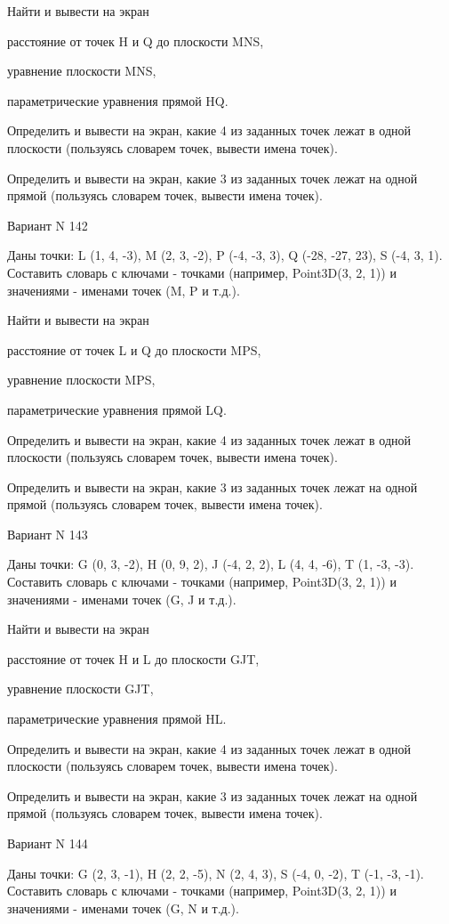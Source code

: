 \documentclass[11pt]{report}
\begin{document}
Найти и вывести на экран


расстояние от точек H и Q до плоскости MNS,


уравнение плоскости MNS,


параметрические уравнения прямой HQ.


Определить и вывести на экран, какие 4 из заданных точек лежат в одной плоскости (пользуясь словарем точек, вывести имена точек).


Определить и вывести на экран, какие 3 из заданных точек лежат на одной прямой (пользуясь словарем точек, вывести имена точек).

\newpage
Вариант N 142

Даны точки: L (1, 4, -3), M (2, 3, -2), P (-4, -3, 3), Q (-28, -27, 23), S (-4, 3, 1).
Составить словарь с ключами - точками (например, Point3D(3, 2, 1)) и значениями - именами точек (M, P и т.д.).


Найти и вывести на экран


расстояние от точек L и Q до плоскости MPS,


уравнение плоскости MPS,


параметрические уравнения прямой LQ.


Определить и вывести на экран, какие 4 из заданных точек лежат в одной плоскости (пользуясь словарем точек, вывести имена точек).


Определить и вывести на экран, какие 3 из заданных точек лежат на одной прямой (пользуясь словарем точек, вывести имена точек).

\newpage
Вариант N 143

Даны точки: G (0, 3, -2), H (0, 9, 2), J (-4, 2, 2), L (4, 4, -6), T (1, -3, -3).
Составить словарь с ключами - точками (например, Point3D(3, 2, 1)) и значениями - именами точек (G, J и т.д.).


Найти и вывести на экран


расстояние от точек H и L до плоскости GJT,


уравнение плоскости GJT,


параметрические уравнения прямой HL.


Определить и вывести на экран, какие 4 из заданных точек лежат в одной плоскости (пользуясь словарем точек, вывести имена точек).


Определить и вывести на экран, какие 3 из заданных точек лежат на одной прямой (пользуясь словарем точек, вывести имена точек).

\newpage
Вариант N 144

Даны точки: G (2, 3, -1), H (2, 2, -5), N (2, 4, 3), S (-4, 0, -2), T (-1, -3, -1).
Составить словарь с ключами - точками (например, Point3D(3, 2, 1)) и значениями - именами точек (G, N и т.д.).
\end{document}
